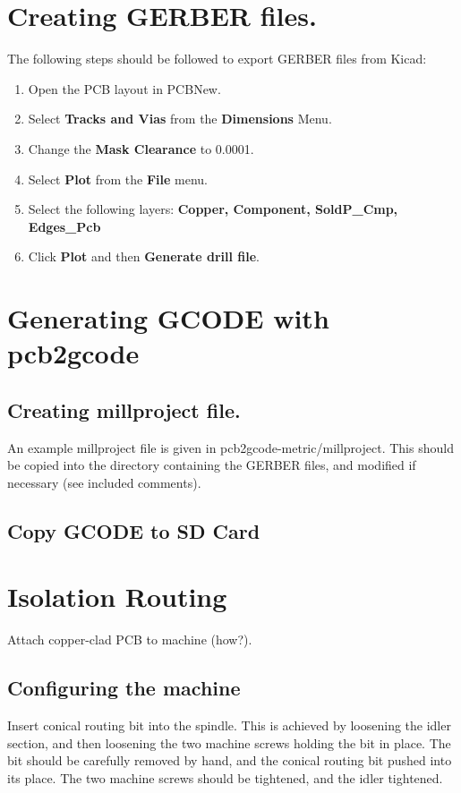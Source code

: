 \documentclass[a4paper,11pt]{article}  %
\begin{document}
\section{Creating GERBER files.}
The following steps should be followed to export GERBER files from Kicad:

\begin{enumerate}
	\item	Open the PCB layout in PCBNew.
	\item	Select \textbf{Tracks and Vias} from the \textbf{Dimensions} Menu.
	\item	Change the \textbf{Mask Clearance} to 0.0001.
	\item	Select \textbf{Plot} from the \textbf{File} menu.
	\item	Select the following layers: \textbf{Copper, Component, SoldP_Cmp, Edges_Pcb}
	\item	Click \textbf{Plot} and then \textbf{Generate drill file}.
\end{enumerate}

\section{Generating GCODE with pcb2gcode}
\subsection{Creating millproject file.}
An example millproject file is given in pcb2gcode-metric/millproject. This should be copied
into the directory containing the GERBER files, and modified if necessary (see included comments).

\subsection{Copy GCODE to SD Card}

\section{Isolation Routing}
Attach copper-clad PCB to machine (how?).

\subsection{Configuring the machine}
Insert conical routing bit into the spindle. This is achieved by loosening
the idler section, and then loosening the two machine screws holding the bit in place.
The bit should be carefully removed by hand, and the conical routing bit 
pushed into its place. The two machine screws should be tightened, and the idler
tightened.
\end{document}
